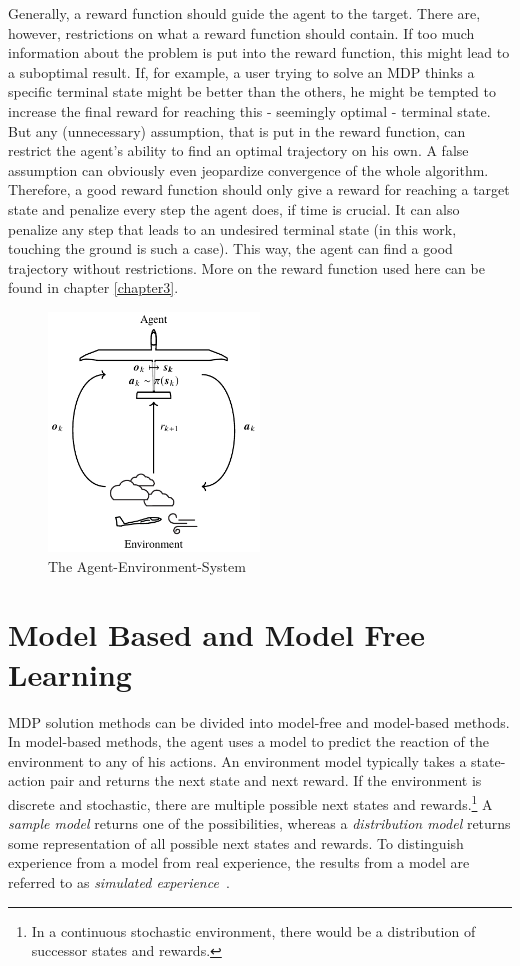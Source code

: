 Generally, a reward function should guide the agent to the target. There are, however, restrictions on what a reward function should contain. If too much information about the problem is put into the reward function, this might lead to a suboptimal result. If, for example, a user trying to solve an MDP thinks a specific terminal state might be better than the others, he might be tempted to increase the final reward for reaching this - seemingly optimal - terminal state. But any (unnecessary) assumption, that is put in the reward function, can restrict the agent's ability to find an optimal trajectory on his own. A false assumption can obviously even jeopardize convergence of the whole algorithm. Therefore, a good reward function should only give a reward for reaching a target state and penalize every step the agent does, if time is crucial. It can also penalize any step that leads to an undesired terminal state (in this work, touching the ground is such a case). This way, the agent can find a good trajectory without restrictions. More on the reward function used here can be found in chapter \ref{chapter3}.

\begin{figure}[h]
	\centering
	\includegraphics[width=0.5\textwidth]{src/pics/RLProblem.pdf}
	\caption{The Agent-Environment-System \cite{Notter2018}}
	\label{fig:agent_env_system} 
\end{figure}

\section{Model Based and Model Free Learning}
\label{sec:modelbasedmodelfree}

MDP solution methods can be divided into model-free and model-based methods. In model-based methods, the agent uses a model to predict the reaction of the environment to any of his actions. An environment model typically takes a state-action pair and returns the next state and next reward. If the environment is discrete and stochastic, there are multiple possible next states and rewards.\footnote{In a continuous stochastic environment, there would be a distribution of successor states and rewards.} A \textit{sample model} returns one of the possibilities, whereas a \textit{distribution model} returns some representation of all possible next states and rewards. To distinguish experience from a model from real experience, the results from a model are referred to as \textit{simulated experience}~\cite[section~8.1]{SuttonBarto2018}.

